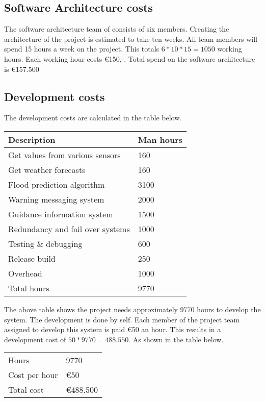 \subsection{Software Architecture costs}
The software architecture team of \CompanyName consists of six members. Creating the architecture of the project is estimated to take ten weeks. All team members will spend 15 hours a week on the project. This totals $6*10*15=1050$ working hours. Each working hour costs \euro{}150,-. Total spend on the software architecture is \euro{}157.500

\subsection{Development costs}
The development costs are calculated in the table below.\\
\newline
\begin{longtable}{|L{}|L{}|}
	\toprule
	\textbf{Description} & \textbf{Man hours} \\ \midrule
	Get values from various sensors & 160 \\ 
	Get weather forecasts & 160 \\ 
	Flood prediction algorithm & 3100 \\ 
	Warning messaging system  & 2000 \\ 
	Guidance information system & 1500 \\ 
	Redundancy and fail over systems & 1000 \\ 
	Testing \& debugging & 600 \\ 
	Release build & 250 \\
	Overhead & 1000 \\ 
	Total hours & 9770 \\ \midrule
\end{longtable}

The above table shows the project needs approximately 9770 hours to develop the system. The development is done by \CompanyName self. Each member of the project team assigned to develop this system is paid \euro{}50 an hour. This results in a development cost of $50*9770=488.550$. As shown in the table below.

\begin{tabular}{L{}|L{}|}
Hours & 9770 \\
Cost per hour & \euro{}50 \\
Total cost & \euro{}488.500 \\ \bottomrule
\end{tabular}

